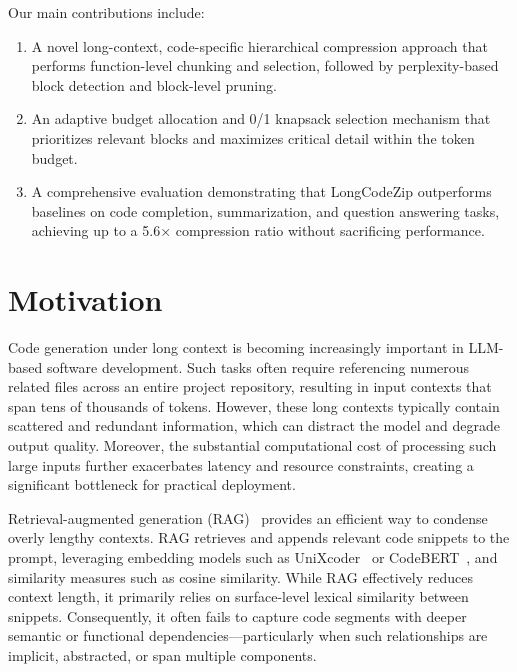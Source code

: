 \documentclass[10pt,conference]{IEEEtran}
\newcommand{\todoc}[2]{{\textcolor{#1}{\textbf{[#2]}}}}
\newcommand{\question}[1]{\todoc{BrickRed}{\textbf{Question: #1}}}
\newcommand{\shi}[1]{\todoc{orange}{Shi: #1}}
\newcommand{\approach}{{LongCodeZip}\xspace} %
\begin{document}
Our main contributions include:
\begin{enumerate}
    \item A novel long-context, code-specific hierarchical compression approach that performs function-level chunking and selection, followed by perplexity-based block detection and block-level pruning.
    \item An adaptive budget allocation and 0/1 knapsack selection mechanism that prioritizes relevant blocks and maximizes critical detail within the token budget.
    \item A comprehensive evaluation demonstrating that \approach outperforms baselines on code completion, summarization, and question answering tasks, achieving up to a 5.6× compression ratio without sacrificing performance.
\end{enumerate}

\section{Motivation}\label{sec:motivation}


Code generation under long context is becoming increasingly important in LLM-based software development. Such tasks often require referencing numerous related files across an entire project repository, resulting in input contexts that span tens of thousands of tokens.
However, these long contexts typically contain scattered and redundant information, which can distract the model and degrade output quality. Moreover, the substantial computational cost of processing such large inputs further exacerbates latency and resource constraints, creating a significant bottleneck for practical deployment.

Retrieval-augmented generation (RAG)~\cite{li2024retrieval,zhang2023repocoder} provides an efficient way to condense overly lengthy contexts. RAG retrieves and appends relevant code snippets to the prompt, leveraging embedding models such as UniXcoder~\cite{guo2022unixcoder} or CodeBERT~\cite{feng2020codebert}, and similarity measures such as cosine similarity. 
While RAG effectively reduces context length, it primarily relies on surface-level lexical similarity between snippets. Consequently, it often fails to capture code segments with deeper semantic or functional dependencies—particularly when such relationships are implicit, abstracted, or span multiple components.
\end{document}
